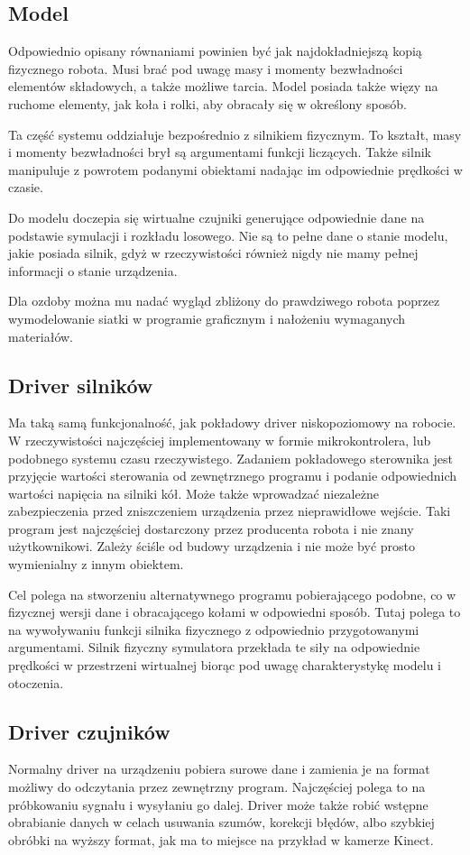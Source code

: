 \subsection{Model}
 Odpowiednio opisany równaniami powinien być jak najdokładniejszą kopią fizycznego robota.
 Musi brać pod uwagę masy i momenty bezwładności elementów składowych, a także możliwe tarcia.
 Model posiada także więzy na ruchome elementy, jak koła i rolki, aby obracały się w określony sposób.
 
 Ta część systemu oddziałuje bezpośrednio z silnikiem fizycznym. 
 To kształt, masy i momenty bezwładności brył są argumentami funkcji liczących.
 Także silnik manipuluje z powrotem podanymi obiektami nadając im odpowiednie prędkości w czasie.
 
 Do modelu doczepia się wirtualne czujniki generujące odpowiednie dane na podstawie symulacji i rozkładu losowego.
 Nie są to pełne dane o stanie modelu, jakie posiada silnik, gdyż w rzeczywistości również nigdy nie mamy pełnej informacji o stanie urządzenia.
 
 Dla ozdoby można mu nadać wygląd zbliżony do prawdziwego robota poprzez wymodelowanie siatki w programie graficznym i nałożeniu wymaganych materiałów.

 \subsection{Driver silników}
 Ma taką samą funkcjonalność, jak pokładowy driver niskopoziomowy na robocie.
 W rzeczywistości najczęściej implementowany w formie mikrokontrolera, lub podobnego systemu czasu rzeczywistego.
 Zadaniem pokładowego sterownika jest przyjęcie wartości sterowania od zewnętrznego programu i podanie odpowiednich wartości napięcia na silniki kół.
 Może także wprowadzać niezależne zabezpieczenia przed zniszczeniem urządzenia przez nieprawidłowe wejście.
 Taki program jest najczęściej dostarczony przez producenta robota i nie znany użytkownikowi.
 Zależy ściśle od budowy urządzenia i nie może być prosto wymienialny z innym obiektem.
 
 Cel polega na stworzeniu alternatywnego programu pobierającego podobne, co w fizycznej wersji dane i obracającego kołami w odpowiedni sposób.
 Tutaj polega to na wywoływaniu funkcji silnika fizycznego z odpowiednio przygotowanymi argumentami.
 Silnik fizyczny symulatora przekłada te siły na odpowiednie prędkości w przestrzeni wirtualnej biorąc pod uwagę charakterystykę modelu i otoczenia.
 
 \subsection{Driver czujników}
 Normalny driver na urządzeniu pobiera surowe dane i zamienia je na format możliwy do odczytania przez zewnętrzny program.
 Najczęściej polega to na próbkowaniu sygnału i wysyłaniu go dalej.
 Driver może także robić wstępne obrabianie danych w celach usuwania szumów, korekcji błędów, albo szybkiej obróbki na wyższy format, jak ma to miejsce na przykład w kamerze Kinect.
 
